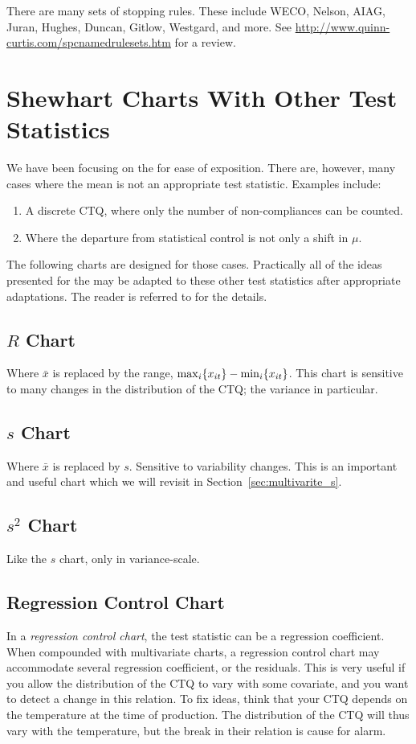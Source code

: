 \begin{extra}
There are many sets of stopping rules. 
These include WECO, Nelson, AIAG, Juran, Hughes, Duncan, Gitlow, Westgard, and more. 
See \url{http://www.quinn-curtis.com/spcnamedrulesets.htm} for a review.
\end{extra}







\section{Shewhart Charts With Other Test Statistics}

We have been focusing on the \barxChart for ease of exposition. There are, however, many cases where the mean is not an appropriate test statistic.
Examples include:
\begin{enumerate}
\item A discrete CTQ, where only the number of non-compliances can be counted. 
\item Where the departure from statistical control is not only a shift in $\mu$. 
\end{enumerate}

The following charts are designed for those cases. 
Practically all of the ideas presented for the \barxChart may be adapted to these other test statistics after appropriate adaptations. 
The reader is referred to \cite{montgomery_introduction_2007} for the details. 

\label{sec:other_control_charts}
\subsection{$R$ Chart}
Where $\bar{x}$ is replaced by the range, $\max_i\{ x_{it} \}-\min_i\{ x_{it} \}$.
This chart is sensitive to many changes in the distribution of the CTQ; the variance in particular. 
\subsection{$s$ Chart}
Where $\bar{x}$ is replaced by $s$. 
Sensitive to variability changes. 
This is an important and useful chart which we will revisit in Section~\ref{sec:multivarite_s}.
\subsection{$s^2$ Chart}
Like the $s$ chart, only in variance-scale.
\subsection{Regression Control Chart}
In a \emph{regression control chart}, the test statistic can be a regression coefficient. 
When compounded with multivariate charts, a regression control chart may accommodate several regression  coefficient, or the residuals. 
This is very useful if you allow the distribution of the CTQ to vary with some covariate, and you want to detect a change in this relation. 
To fix ideas, think that your CTQ depends on the temperature at the time of production. The distribution of the CTQ will thus vary with the temperature, but the break in their relation is cause for alarm.
